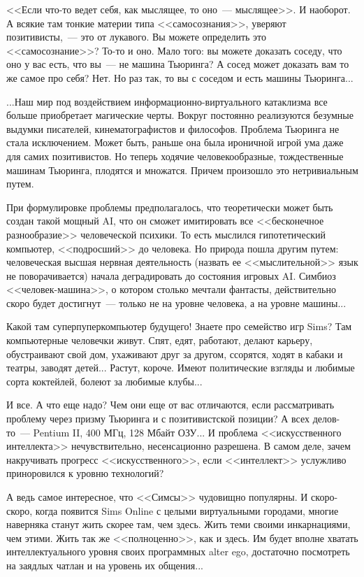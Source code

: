 \documentclass{scrbook}
\newcommand{\flqq}{<<}
\newcommand{\frqq}{>>}
\newcommand{\mdash}{~--- }
\newcommand{\commamdash}{~--- } %
\begin{document}
{\flqq}Если что-то ведет себя, как мыслящее, то оно{\mdash}мыслящее{\frqq}. И наоборот. А всякие там тонкие материи типа {\flqq}самосознания{\frqq}, уверяют позитивисты,{\commamdash}это от лукавого. Вы можете определить это {\flqq}самосознание{\frqq}? То-то и оно. Мало того: вы можете доказать соседу, что оно у вас есть, что вы{\mdash}не машина Тьюринга? А сосед может доказать вам то же самое про себя? Нет. Но раз так, то вы с соседом и есть машины Тьюринга...

...Наш мир под воздействием информационно-виртуального катаклизма все больше приобретает магические черты. Вокруг постоянно реализуются безумные выдумки писателей, кинематографистов и философов. Проблема Тьюринга не стала исключением. Может быть, раньше она была ироничной игрой ума даже для самих позитивистов. Но теперь ходячие человекообразные, тождественные машинам Тьюринга, плодятся и множатся. Причем произошло это нетривиальным путем.

При формулировке проблемы предполагалось, что теоретически может быть создан такой мощный AI, что он сможет имитировать все {\flqq}бесконечное разнообразие{\frqq} человеческой психики. То есть мыслился гипотетический компьютер, {\flqq}подросший{\frqq} до человека. Но природа пошла другим путем: человеческая высшая нервная деятельность (назвать ее {\flqq}мыслительной{\frqq} язык не поворачивается) начала деградировать до состояния игровых AI. Симбиоз {\flqq}человек-машина{\frqq}, о котором столько мечтали фантасты, действительно скоро будет достигнут{\mdash}только не на уровне человека, а на уровне машины...

Какой там суперпуперкомпьютер будущего! Знаете про семейство игр Sims? Там компьютерные человечки живут. Спят, едят, работают, делают карьеру, обустраивают свой дом, ухаживают друг за другом, ссорятся, ходят в кабаки и театры, заводят детей... Растут, короче. Имеют политические взгляды и любимые сорта коктейлей, болеют за любимые клубы...

И все. А что еще надо? Чем они еще от вас отличаются, если рассматривать проблему через призму Тьюринга и с позитивистской позиции? А всех делов-то{\mdash}Pentium II, 400 МГц, 128 Мбайт ОЗУ... И проблема {\flqq}искусственного интеллекта{\frqq} нечувствительно, несенсационно разрешена. В самом деле, зачем накручивать прогресс {\flqq}искусственного{\frqq}, если {\flqq}интеллект{\frqq} услужливо приноровился к уровню технологий?

А ведь самое интересное, что {\flqq}Симсы{\frqq} чудовищно популярны. И скоро-скоро, когда появится Sims Online с целыми виртуальными городами, многие наверняка станут жить скорее там, чем здесь. Жить теми своими инкарнациями, чем этими. Жить так же {\flqq}полноценно{\frqq}, как и здесь. Им будет вполне хватать интеллектуального уровня своих программных alter ego, достаточно посмотреть на заядлых чатлан и на уровень их общения...
\end{document}

